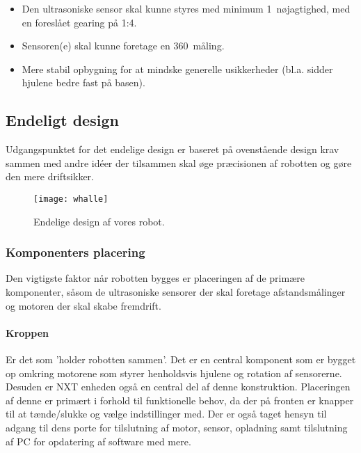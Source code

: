 \begin{itemize}
\item Den ultrasoniske sensor skal kunne styres med  minimum 1\degree~nøjagtighed, med en foreslået gearing på 1:4.
\item Sensoren(e) skal kunne foretage en 360\degree~måling.
\item Mere stabil opbygning for at mindske generelle usikkerheder (bl.a. sidder hjulene bedre fast på basen).
\end{itemize} 


\subsection{Endeligt design}
Udgangspunktet for det endelige design er baseret på ovenstående design krav sammen med andre idéer der tilsammen skal øge præcisionen af robotten og gøre den mere driftsikker.

\begin{figure}
\centering
\texttt{[image: whalle]}
\caption{Endelige design af vores robot.}
\label{robot:opbygning}
\end{figure}

\subsubsection{Komponenters placering}

Den vigtigste faktor når robotten bygges er placeringen af de primære komponenter, såsom de ultrasoniske sensorer der skal foretage afstandsmålinger og motoren der skal skabe fremdrift.

\paragraph{Kroppen}
Er det som 'holder robotten sammen'.
Det er en central komponent som er bygget op omkring motorene som styrer henholdsvis hjulene og rotation af sensorerne.
Desuden er NXT enheden også en central del af denne konstruktion.
Placeringen af denne er primært i forhold til funktionelle behov, da der på fronten er knapper til at tænde/slukke og vælge indstillinger med.
Der er også taget hensyn til adgang til dens porte for tilslutning af motor, sensor, opladning samt tilslutning af PC for opdatering af software med mere.

